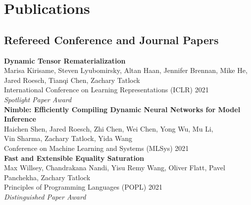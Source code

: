 \documentclass[10pt]{article}
\begin{document}





\section*{Publications}

\subsection*{Refereed Conference and Journal Papers}

\textbf{%
Dynamic Tensor Rematerialization
} \\
Marisa Kirisame, Steven Lyubomirsky, Altan Haan, Jennifer Brennan, Mike He, \\
Jared Roesch, Tianqi Chen, Zachary Tatlock \\
International Conference on Learning Representations (ICLR) 2021 \\
\textit{Spotlight Paper Award} \\

\textbf{%
Nimble: Efficiently Compiling Dynamic Neural Networks for Model Inference
} \\
Haichen Shen, Jared Roesch, Zhi Chen, Wei Chen, Yong Wu, Mu Li, \\
Vin Sharma, Zachary Tatlock, Yida Wang \\
Conference on Machine Learning and Systems (MLSys) 2021 \\

\textbf{%
  Fast and Extensible Equality Saturation
} \\
Max Willsey, Chandrakana Nandi, Yisu Remy Wang, Oliver Flatt, Pavel Panchekha, Zachary Tatlock \\
Principles of Programming Languages (POPL) 2021 \\
\textit{Distinguished Paper Award} \\
\end{document}
